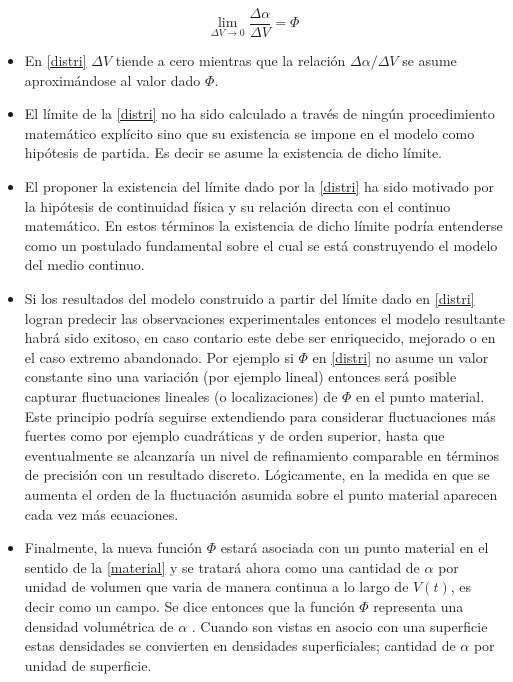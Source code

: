 \documentclass[../notas medios.tex]{subfiles}
\begin{document}
\begin{equation}
\mathop {\lim }\limits_{\Delta V \to 0} \frac{{\Delta \alpha }}{{\Delta V}} = \Phi
\label{distri}
\end{equation}

\begin{itemize}
\item En \cref{distri} $\Delta V$ tiende a cero mientras que la relación $\Delta \alpha /\Delta V$ se asume aproximándose al valor dado $\Phi$.

\item El límite de la \cref{distri} no ha sido calculado a través de ningún
procedimiento matemático explícito sino que su existencia se impone en el modelo como hipótesis de partida.  Es decir se asume la existencia de dicho límite.

\item El proponer la existencia del límite dado por la \cref{distri} ha sido
motivado por la hipótesis de continuidad física y su relación directa con el continuo matemático. En estos términos la existencia de dicho límite podría entenderse como un postulado fundamental sobre el cual se está construyendo el modelo del medio continuo. 

\item Si los resultados del modelo construido a partir del límite dado en
\cref{distri} logran predecir las observaciones experimentales entonces el modelo resultante habrá sido exitoso, en caso contario este debe ser enriquecido, mejorado o en el caso extremo abandonado.  Por ejemplo si $\Phi$ en \cref{distri} no asume un valor constante sino una variación (por ejemplo lineal) entonces será posible capturar fluctuaciones lineales (o localizaciones) de $\Phi$ en el punto material.  Este principio podría seguirse extendiendo para considerar fluctuaciones más fuertes como por ejemplo cuadráticas y de orden superior, hasta que eventualmente se alcanzaría un nivel de refinamiento comparable en términos de precisión con un resultado discreto.  Lógicamente, en la medida en que se aumenta el orden de la fluctuación asumida sobre el punto material aparecen cada vez más ecuaciones.

\item Finalmente, la nueva función $\Phi$ estará asociada con un punto material en el sentido de la \cref{material} y se tratará ahora como una cantidad de $\alpha$ por unidad de volumen que varia de manera continua a lo largo de $V(t)$, es decir como un campo.  Se dice entonces que la función $\Phi$ representa una densidad volumétrica de $\alpha$ .  Cuando son vistas en asocio con una superficie estas densidades se convierten en densidades superficiales; cantidad de $\alpha$ por unidad de superficie.

\end{itemize}
\end{document}
